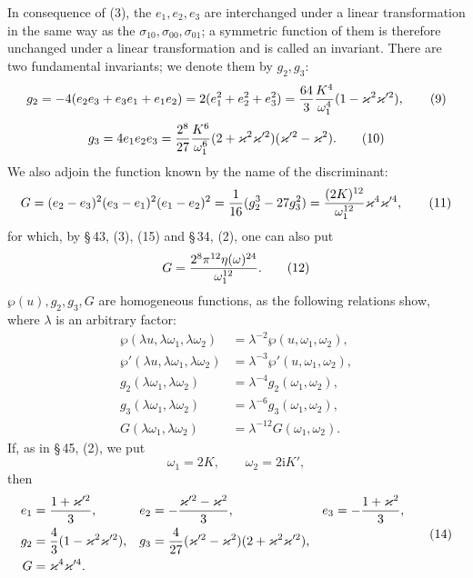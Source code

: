 \documentclass[11pt]{article}
\providecommand{\ii}{\mathrm{i}}
\begin{document}
In consequence of (3), the $e_1,e_2,e_3$ are interchanged under a linear transformation in the same way as the $\sigma_{10},\sigma_{00},\sigma_{01}$; a symmetric function of them is therefore unchanged under a linear transformation and is called an invariant. There are two fundamental invariants; we denote them by $g_2,g_3$:
\begin{equation}
 g_2=-4(e_2e_3+e_3e_1+e_1e_2)=2(e_1^2+e_2^2+e_3^2)
 ={64\over3}{K^4\over\omega_1^4}(1-\varkappa^2\varkappa'^2),
\tag{9}
\end{equation}
\begin{equation}
 g_3=4e_1e_2e_3={2^8\over27}{K^6\over\omega_1^6}(2+\varkappa^2\varkappa'^2)(\varkappa'^2-\varkappa^2).
\tag{10}
\end{equation}
We also adjoin the function known by the name of the discriminant:
\begin{equation}
G=(e_2-e_3)^2(e_3-e_1)^2(e_1-e_2)^2={1\over16}(g_2^3-27g_3^2)
={ (2K)^{12}\over\omega_1^{12}}\varkappa^4\varkappa'^4,
\tag{11}
\end{equation}
for which, by \S\,43, (3), (15) and \S\,34, (2), one can also put
\begin{equation}
G={2^8\pi^{12}\eta(\omega)^{24}\over\omega_1^{12}}.
\tag{12}
\end{equation}
$\wp(u),g_2,g_3,G$ are homogeneous functions, as the following relations show, where $\lambda$ is an arbitrary factor:
\begin{equation}
\begin{aligned}
\wp(\lambda u,\lambda\omega_1,\lambda\omega_2)&=\lambda^{-2}\wp(u,\omega_1,\omega_2),\\
\wp'(\lambda u,\lambda\omega_1,\lambda\omega_2)&=\lambda^{-3}\wp'(u,\omega_1,\omega_2),\\
g_2(\lambda\omega_1,\lambda\omega_2)&=\lambda^{-4}g_2(\omega_1,
\omega_2),\\
g_3(\lambda\omega_1,\lambda\omega_2)&=\lambda^{-6}g_3(\omega_1,
\omega_2),\\
G(\lambda\omega_1,\lambda\omega_2)&=\lambda^{-12}G(\omega_1,\omega_2).
\end{aligned}
\tag{13}
\end{equation}
If, as in \S\,45, (2), we put
\[
\omega_1=2K,
\qquad
\omega_2=2\ii K',
\]
then
\begin{equation}
\begin{aligned}
e_1&={1+\varkappa'^2\over3},&
 e_2&=-{\varkappa'^2-\varkappa^2\over3},&
 e_3&=-{1+\varkappa^2\over3},\\
g_2&={4\over3}(1-\varkappa^2\varkappa'^2),&
 g_3&={4\over27}(\varkappa'^2-\varkappa^2)(2+\varkappa^2\varkappa'^2),\\
G&=\varkappa^4\varkappa'^4.
\end{aligned}
\tag{14}
\end{equation}
\end{document}
